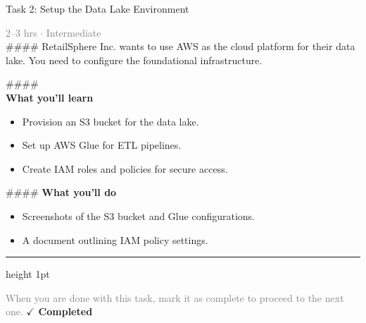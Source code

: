 \documentclass[10pt,a4paper]{article}
\begin{document}
\begin{taskbox}{Task 2: Setup the Data Lake Environment}

    {\small \textcolor{gray}{2--3 hrs $\cdot$ Intermediate}}\\[12pt]

    \#\#\#\#   
RetailSphere Inc. wants to use AWS as the cloud platform for their data lake. You need to configure the foundational infrastructure.

\#\#\#\# \\[10pt]
\vspace{8pt}
{\large \textbf{\textcolor{brandLight}{What you'll learn}}}\\[4pt]  
\begin{itemize}
    \item Provision an S3 bucket for the data lake.  
    \item Set up AWS Glue for ETL pipelines.  
    \item Create IAM roles and policies for secure access.  
\end{itemize}

\#\#\#\# \vspace{8pt}
{\large \textbf{\textcolor{brandLight}{What you'll do}}}\\[4pt]  
\begin{itemize}
    \item Screenshots of the S3 bucket and Glue configurations.  
    \item A document outlining IAM policy settings.\par
\end{itemize}

    \vspace{16pt}

    \textcolor{cardBorder}{\hrule height 1pt}\vspace{8pt}

    \small \textcolor{gray}{When you are done with this task, mark it as complete to proceed to the next one.} \hfill \textbf{\textcolor{brandDark}{$\checkmark$ Completed}}

\end{taskbox}
\end{document}
